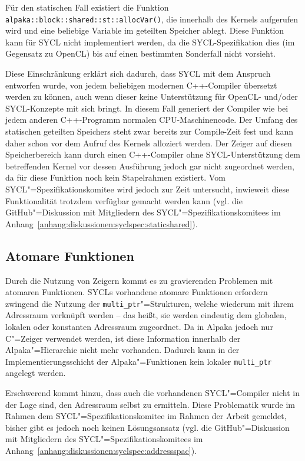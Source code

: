 Für den statischen Fall existiert die Funktion
\texttt{alpaka::block::shared::st::allocVar()}, die innerhalb des Kernels
aufgerufen wird und eine beliebige Variable im geteilten Speicher ablegt. Diese
Funktion kann für SYCL nicht implementiert werden, da die SYCL-Spezifikation
dies (im Gegensatz zu OpenCL) bis auf einen bestimmten Sonderfall
\cite[siehe][Abschnitt 4.8.5.3]{sycl2019} nicht vorsieht.

Diese Einschränkung erklärt sich dadurch, dass SYCL mit dem Anspruch entworfen
wurde, von jedem beliebigen modernen C++-Compiler übersetzt werden zu können,
auch wenn dieser keine Unterstützung für OpenCL- und/oder SYCL-Konzepte mit sich
bringt. In diesem Fall generiert der Compiler wie bei jedem anderen C++-Programm
normalen CPU-Maschinencode. Der Umfang des statischen geteilten Speichers steht
zwar bereits zur Compile-Zeit fest und kann daher schon vor dem Aufruf des
Kernels alloziert werden. Der Zeiger auf diesen Speicherbereich kann durch einen
C++-Compiler ohne SYCL-Unterstützung dem betreffenden Kernel vor dessen
Ausführung jedoch gar nicht zugeordnet werden, da für diese Funktion noch kein
Stapelrahmen existiert. Vom SYCL"=Spezifikationskomitee wird jedoch zur Zeit
untersucht, inwieweit diese Funktionalität trotzdem verfügbar gemacht werden
kann (vgl. die GitHub"=Diskussion mit Mitgliedern des
SYCL"=Spezifikationskomitees im
Anhang~\ref{anhang:diskussionen:syclspec:staticshared}).

\subsection{Atomare Funktionen}\label{implementierung:probleme:atomics}

Durch die Nutzung von Zeigern kommt es zu gravierenden Problemen mit atomaren
Funktionen. SYCLs vorhandene atomare Funktionen erfordern zwingend die Nutzung
der \texttt{multi\_ptr}"=Strukturen, welche wiederum mit ihrem Adressraum
verknüpft werden -- das heißt, sie werden eindeutig dem globalen, lokalen oder
konstanten Adressraum zugeordnet. Da in Alpaka jedoch nur C"=Zeiger
verwendet werden, ist diese Information innerhalb der Alpaka"=Hierarchie nicht
mehr vorhanden. Dadurch kann in der Implementierungsschicht der
Alpaka"=Funktionen kein lokaler \texttt{multi\_ptr} angelegt werden.

Erschwerend kommt hinzu, dass auch die vorhandenen SYCL"=Compiler nicht in der
Lage sind, den Adressraum selbst zu ermitteln. Diese Problematik wurde im Rahmen
dem SYCL"=Spezifikationskomitee im Rahmen der Arbeit gemeldet, bisher gibt es
jedoch noch keinen Lösungsansatz (vgl. die GitHub"=Diskussion mit Mitgliedern
des SYCL"=Spezifikationskomitees im
Anhang~\ref{anhang:diskussionen:syclspec:addressspac}).

